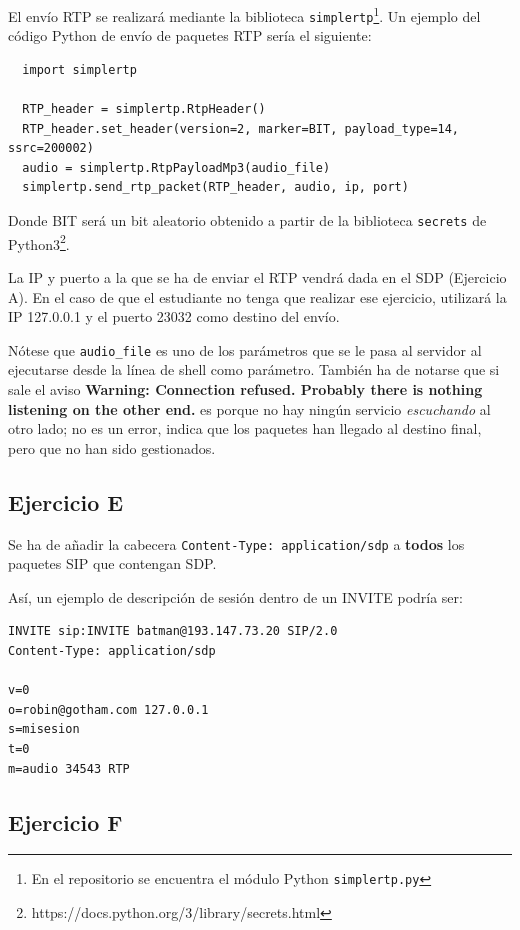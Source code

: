 \documentclass[a4paper,11pt]{article}
\begin{document}
El envío RTP se realizará mediante la biblioteca \texttt{simplertp}\footnote{En el repositorio se encuentra el módulo Python \texttt{simplertp.py}}. Un ejemplo del código Python de envío de paquetes RTP sería el siguiente:

\begin{verbatim}
  import simplertp

  RTP_header = simplertp.RtpHeader()
  RTP_header.set_header(version=2, marker=BIT, payload_type=14, ssrc=200002)
  audio = simplertp.RtpPayloadMp3(audio_file)
  simplertp.send_rtp_packet(RTP_header, audio, ip, port)
\end{verbatim}

Donde BIT será un bit aleatorio obtenido a partir de la biblioteca \texttt{secrets} de Python3\footnote{https://docs.python.org/3/library/secrets.html}.

La IP y puerto a la que se ha de enviar el RTP vendrá dada en el SDP (Ejercicio A). En el caso de que el estudiante no tenga que realizar ese ejercicio, utilizará la IP 127.0.0.1 y el puerto 23032 como destino del envío.

Nótese que \texttt{audio\_file} es uno de los parámetros que se le pasa al servidor al ejecutarse desde la línea de shell como parámetro. También ha de notarse que si sale el aviso {\bf Warning: Connection refused. Probably there is nothing listening on the other end.} es porque no hay ningún servicio \emph{escuchando} al otro lado; no es un error, indica que los paquetes han llegado al destino final, pero que no han sido gestionados.


\subsection*{Ejercicio E}

Se ha de añadir la cabecera \texttt{Content-Type: application/sdp} a {\bf todos} los paquetes SIP que contengan SDP.

Así, un ejemplo de descripción de sesión dentro de un INVITE podría ser:

\begin{verbatim}
INVITE sip:INVITE batman@193.147.73.20 SIP/2.0
Content-Type: application/sdp

v=0
o=robin@gotham.com 127.0.0.1
s=misesion
t=0
m=audio 34543 RTP
\end{verbatim}


\subsection*{Ejercicio F}
\end{document}
